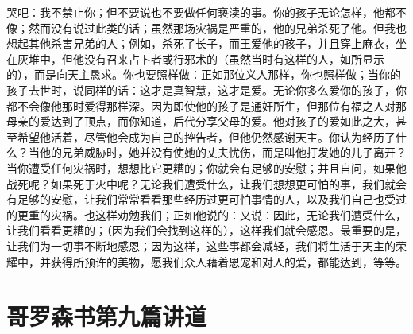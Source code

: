 哭吧：我不禁止你；但不要说也不要做任何亵渎的事。你的孩子无论怎样，他都不像；然而没有说过此类的话；虽然那场灾祸是严重的，他的兄弟杀死了他。但我也想起其他杀害兄弟的人；例如，杀死了长子，而王爱他的孩子，并且穿上麻衣，坐在灰堆中，但他没有召来占卜者或行邪术的（虽然当时有这样的人，如所显示的），而是向天主恳求。你也要照样做：正如那位义人那样，你也照样做；当你的孩子去世时，说同样的话：这才是真智慧，这才是爱。无论你多么爱你的孩子，你都不会像他那时爱得那样深。因为即使他的孩子是通奸所生，但那位有福之人对那母亲的爱达到了顶点，而你知道，后代分享父母的爱。他对孩子的爱如此之大，甚至希望他活着，尽管他会成为自己的控告者，但他仍然感谢天主。你认为经历了什么？当他的兄弟威胁时，她并没有使她的丈夫忧伤，而是叫他打发她的儿子离开？当你遭受任何灾祸时，想想比它更糟的；你就会有足够的安慰；并且自问，如果他战死呢？如果死于火中呢？无论我们遭受什么，让我们想想更可怕的事，我们就会有足够的安慰，让我们常常看看那些经历过更可怕事情的人，以及我们自己也受过的更重的灾祸。也这样劝勉我们；正如他说的：又说：因此，无论我们遭受什么，让我们看看更糟的；（因为我们会找到这样的），这样我们就会感恩。最重要的是，让我们为一切事不断地感恩；因为这样，这些事都会减轻，我们将生活于天主的荣耀中，并获得所预许的美物，愿我们众人藉着恩宠和对人的爱，都能达到，等等。\par



\section{哥罗森书第九篇讲道}

\par

\par

